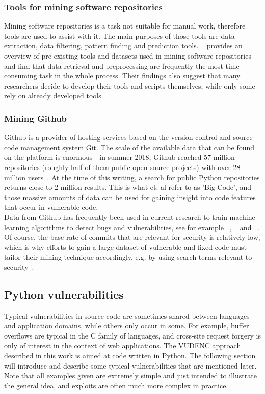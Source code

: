 \documentclass[
a4paper,
pagesize,
pdftex,
12pt,
twoside, %
BCOR=5mm, %
ngerman,
fleqn,
final,
]{scrartcl}
\begin{document}
	\subsubsection{Tools for mining software repositories}
	Mining software repositories is a task not suitable for manual work, therefore tools are used to assist with it. The main purposes of those tools are data extraction, data filtering, pattern finding and prediction tools. ~\cite{Chaturvedi.2013} provides an overview of pre-existing tools and datasets used in mining software repositories and find that data retrieval and preprocessing are frequently the most time-consuming task in the whole process. Their findings also suggest that many researchers decide to develop their tools and scripts themselves, while only some rely on already developed tools. 
	\subsubsection{Mining Github}
	Github is a provider of hosting services based on the version control and source code management system Git. The scale of the available data that can be found on the platform is enormous - in summer 2018, Github reached 57 million repositories (roughly half of them public open-source projects) with over 28 million users~\cite{Github.com.b}. At the time of this writing, a search for public Python repositories returns close to 2 million results. This is what \cite{Allamanis.2018} et. al refer to as 'Big Code', and those massive amounts of data can be used for gaining insight into code features that occur in vulnerable code.\\
	Data from Github has frequently been used in current research to train machine learning algorithms to detect bugs and vulnerabilities, see for example ~\cite{Zhou.2017}, ~\cite{Russell.2018} and ~\cite{Liu.2018}. Of course, the base rate of commits that are relevant for security is relatively low, which is why efforts to gain a large dataset of vulnerable and fixed code must tailor their mining technique accordingly, e.g. by using search terms relevant to security~\cite{Zhou.2017}.
	
	\subsection{Python vulnerabilities}
	
	Typical vulnerabilities in source code are sometimes shared between languages and application domains, while others only occur in some. For example, buffer overflows are typical in the C family of languages, and cross-site request forgery is only of interest in the context of web applications. The VUDENC approach described in this work is aimed at code written in Python. The following section will introduce and describe some typical vulnerabilities that are mentioned later. Note that all examples given are extremely simple and just intended to illustrate the general idea, and exploits are often much more complex in practice.
	
\end{document}
